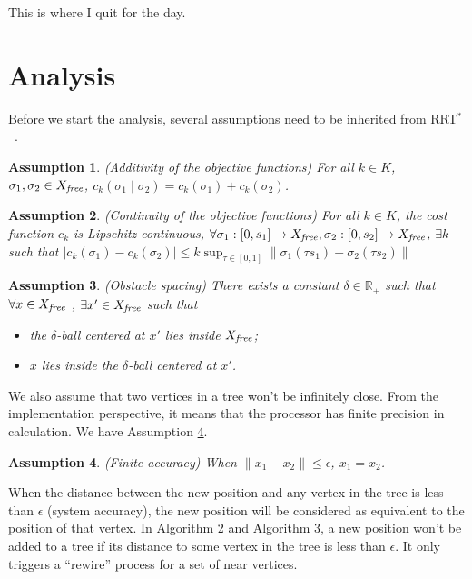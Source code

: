 \documentclass[conference]{IEEEtran}
\newtheorem{asmp}{Assumption}
\begin{document}
{\sc This is where I quit for the day.}

\section{Analysis}
\label{sec:theoretic_analysis}

Before we start the analysis, several assumptions need to be inherited from  RRT$^{*}$~\cite{Karaman.Frazzoli:RSS10}.
\begin{asmp}{(Additivity of the objective functions)}
\label{asmp:additivity}	
For all $ k \in K $, $ \sigma_{1} , \sigma_{2} \in X_{\it free} $,
$ c_{k} ( \sigma_{1}  \mid \sigma_{2} ) = c_{k} ( \sigma_{1} ) + c_{k} ( \sigma_{2} ) $.
\end{asmp}

\begin{asmp}{(Continuity of the objective functions)}
\label{asmp:continuity}
For all $ k \in K $, the cost function $ c_{k} $ is Lipschitz continuous,
$ \forall \sigma_{1} : [ 0, s_{1} ] \rightarrow X_{\it free}, \sigma_{2} : [0, s_{2} ] \rightarrow X_{\it free} $,
$ \exists k $ such that 
$ | c_{k} ( \sigma_{1} ) - c_{k} ( \sigma_{2} ) | \leq k \sup_{\tau \in [0,1]} \lVert \sigma_{1} (\tau s_{1}) - \sigma_{2} (\tau s_{2}) \rVert $
\end{asmp}

\begin{asmp}{(Obstacle spacing)}
\label{asmp:spacing}
There exists a constant $ \delta \in \mathbb{R}_{+} $ such that $ \forall x \in X_{\it free} $ , $ \exists x' \in X_{\it free} $ such that
\begin{itemize}
\item the $ \delta $-ball centered at $ x' $ lies inside $ X_{\it free} $;
\item $ x $ lies inside the $ \delta $-ball centered at $ x' $.
\end{itemize}
\end{asmp}

We also assume that two vertices in a tree won't be infinitely close.
From the implementation perspective, it means that the processor has finite precision in calculation.
We have Assumption \ref{asmp:finite_accuracy}.
\begin{asmp}{(Finite accuracy)}
\label{asmp:finite_accuracy}
When $ \lVert x_{1} - x_{2} \rVert \leq \epsilon $, $ x_{1} = x_{2} $.
\end{asmp}
When the distance between the new position and any vertex in the tree is less than $ \epsilon $ (system accuracy), the new position will be considered as equivalent to the position of that vertex.
In Algorithm 2 and Algorithm 3, a new position won't be added to a tree if its distance to some vertex in the tree is less than $ \epsilon $.
It only triggers a ``rewire'' process for a set of near vertices.
\end{document}
